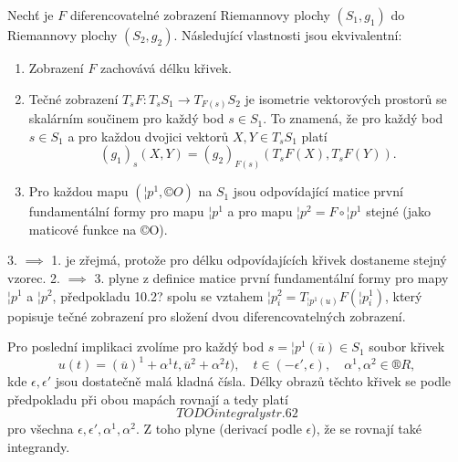 \documentclass[12pt]{article}                   %
\begin{document}
        \begin{lemma}
            Nechť je $F$ diferencovatelné zobrazení Riemannovy plochy $(S_1, g_1)$ do Riemannovy plochy $(S_2, g_2)$. Následující vlastnosti jsou ekvivalentní:

            \begin{enumerate}
                \item Zobrazení $F$ zachovává délku křivek.
                \item Tečné zobrazení $T_sF: T_sS_1 \rightarrow T_{F(s)}S_2$ je isometrie vektorových prostorů se skalárním součinem pro každý bod $s \in S_1$. To znamená, že pro každý bod $s \in S_1$ a pro každou dvojici vektorů $X, Y \in T_sS_1$ platí
                        $$ (g_1)_s(X, Y) = (g_2)_{F(s)}(T_sF(X), T_sF(Y)). $$
                \item Pro každou mapu $(¦p^1, ©O)$ na $S_1$ jsou odpovídající matice první fundamentální formy pro mapu $¦p^1$ a pro mapu $¦p^2 = F \circ ¦p^1$ stejné (jako maticové funkce na ©O).
            \end{enumerate}
            
            \begin{dukazin}
                3. $\implies$ 1. je zřejmá, protože pro délku odpovídajících křivek dostaneme stejný vzorec. 2. $\implies$ 3. plyne z definice matice první fundamentální formy pro mapy $¦p^1$ a $¦p^2$, předpokladu 10.2? spolu se vztahem $¦p_i^2 = T_{¦p^1(u)}F(¦p_i^1)$, který popisuje tečné zobrazení pro složení dvou diferencovatelných zobrazení.

                Pro poslední implikaci zvolíme pro každý bod $s = ¦p^1(\overline{u}) \in S_1$ soubor křivek
                $$ u(t) = (\overline{u})^1 + \alpha^1t, \overline{u}^2 + \alpha^2t), \quad t \in (-\epsilon', \epsilon), \quad \alpha^1, \alpha^2 \in ®R, $$
                kde $\epsilon, \epsilon'$ jsou dostatečně malá kladná čísla. Délky obrazů těchto křivek se podle předpokladu při obou mapách rovnají a tedy platí
                $$ TODO integraly str. 62 $$
                pro všechna $\epsilon, \epsilon', \alpha^1, \alpha^2$. Z toho plyne (derivací podle $\epsilon$), že se rovnají také integrandy.
            \end{dukazin}
        \end{lemma}
\end{document}
